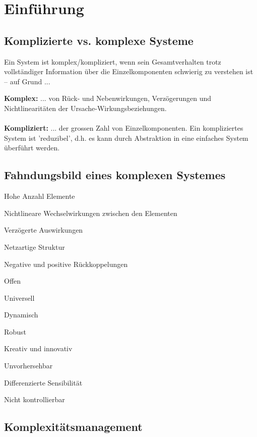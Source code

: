 \section{Einführung}
\subsection{Komplizierte vs. komplexe Systeme}
Ein System ist komplex/kompliziert, wenn sein Gesamtverhalten trotz vollständiger Information über die Einzelkomponenten schwierig zu verstehen ist – auf Grund ...
\begin{multicols}{2}
	\textbf{Komplex:} ... von Rück- und Nebenwirkungen, Verzögerungen und Nichtlinearitäten der Ursache-Wirkungsbeziehungen. \\ \ \\
	\textbf{Kompliziert:} ... der grossen Zahl von Einzelkomponenten. Ein kompliziertes System ist 'reduzibel', d.h. es kann durch Abstraktion in eine einfaches System überführt werden.
\end{multicols}

\subsection{Fahndungsbild eines komplexen Systemes}
\begin{multicols}{3}
	\begin{compactitem}
		\item Hohe Anzahl Elemente
		\item Nichtlineare Wechselwirkungen zwischen den Elementen
		\item Verzögerte Auswirkungen		
		\item Netzartige Struktur
		\item Negative und positive Rückkoppelungen
		\item Offen
		\item Universell
		\item Dynamisch
		\item Robust
		\item Kreativ und innovativ
		\item Unvorhersehbar
		\item Differenzierte Sensibilität
		\item Nicht kontrollierbar
	\end{compactitem}
\end{multicols}

\subsection{Komplexitätsmanagement}
